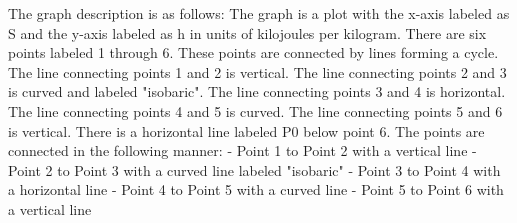 The graph description is as follows: The graph is a plot with the x-axis labeled as S and the y-axis labeled as h in units of kilojoules per kilogram. There are six points labeled 1 through 6. These points are connected by lines forming a cycle. The line connecting points 1 and 2 is vertical. The line connecting points 2 and 3 is curved and labeled "isobaric". The line connecting points 3 and 4 is horizontal. The line connecting points 4 and 5 is curved. The line connecting points 5 and 6 is vertical. There is a horizontal line labeled P0 below point 6. The points are connected in the following manner:
- Point 1 to Point 2 with a vertical line
- Point 2 to Point 3 with a curved line labeled "isobaric"
- Point 3 to Point 4 with a horizontal line
- Point 4 to Point 5 with a curved line
- Point 5 to Point 6 with a vertical line